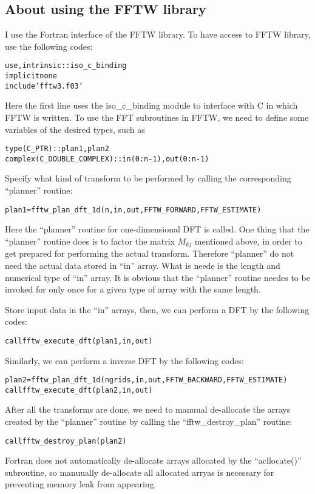 \documentclass{article}
\newenvironment{tmcode}[1][]{\begin{alltt} }{\end{alltt}}
\begin{document}
\

\

\

\

\

\subsection{About using the FFTW library}

I use the Fortran interface of the FFTW library. To have access to FFTW
library, use the following codes:
\begin{tmcode}
use, intrinsic :: iso_c_binding
implicit none
include 'fftw3.f03'
\end{tmcode}
Here the first line uses the iso\_c\_binding module to interface with C in
which FFTW is written. To use the FFT subroutines in FFTW, we need to define
some variables of the desired types, such as
\begin{tmcode}
type(C_PTR) :: plan1, plan2
complex(C_DOUBLE_COMPLEX) :: in(0:n-1), out(0:n-1)
\end{tmcode}
Specify what kind of transform to be performed by calling the corresponding
``planner'' routine:
\begin{tmcode}
plan1 = fftw_plan_dft_1d(n, in,out, FFTW_FORWARD,FFTW_ESTIMATE)
\end{tmcode}
Here the ``planner'' routine for one-dimensional DFT is called. One thing that
the ``planner'' routine does is to factor the matrix $M_{k j}$ mentioned
above, in order to get prepared for performing the actual transform. Therefore
``planner'' do not need the actual data stored in ``in'' array. What is neede
is the length and numerical type of ``in'' array. It is obvious that the
``planner'' routine needes to be invoked for only once for a given type of
array with the same length.

Store input data in the ``in'' arrays, then, we can perform a DFT by the
following codes:
\begin{tmcode}
call fftw_execute_dft(plan1, in, out)
\end{tmcode}
Similarly, we can perform a inverse DFT by the following codes:
\begin{tmcode}
plan2 = fftw_plan_dft_1d(ngrids, in,out,FFTW_BACKWARD,FFTW_ESTIMATE)
call fftw_execute_dft(plan2, in, out)
\end{tmcode}
After all the transforms are done, we need to manuual de-allocate the arrays
created by the ``planner'' routine by calling the ``fftw\_destroy\_plan''
routine:
\begin{tmcode}
call fftw_destroy_plan(plan2)
\end{tmcode}
Fortran does not automatically de-allocate arrays allocated by the
``acllocate()'' subroutine, so manuually de-allocate all allocated arryas is
necessary for preventing memory leak from appearing.
\end{document}
